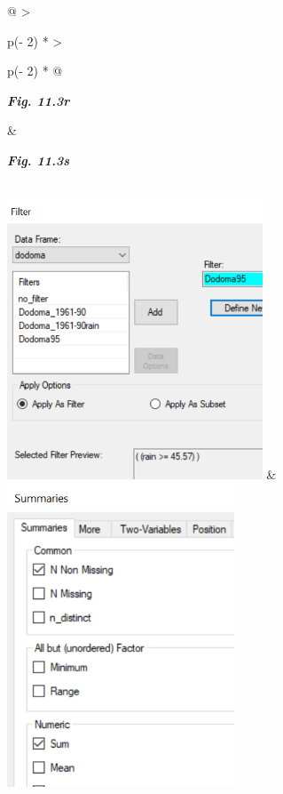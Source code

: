 \documentclass[
  letterpaper,
  DIV=11,
  numbers=noendperiod]{scrreprt}
\begin{document}
\begin{longtable}[]{@{}
  >{\raggedright\arraybackslash}p{(\columnwidth - 2\tabcolsep) * }
  >{\raggedright\arraybackslash}p{(\columnwidth - 2\tabcolsep) * }@{}}
\toprule\noalign{}
\begin{minipage}[b]{\linewidth}\raggedright
\textbf{\emph{Fig. 11.3r}}
\end{minipage} & \begin{minipage}[b]{\linewidth}\raggedright
\textbf{\emph{Fig. 11.3s}}
\end{minipage} \\
\midrule\noalign{}
\endhead
\bottomrule\noalign{}
\endlastfoot
\includegraphics[width=2.99691in,height=3.28174in]{figures/Fig11.3r.png}
&
\includegraphics[width=2.67101in,height=3.55655in]{figures/Fig11.3s.png} \\
\end{longtable}
\end{document}
